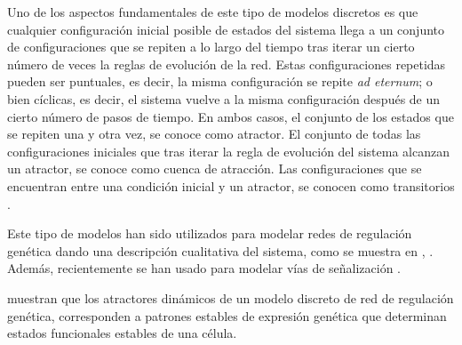 Uno de los aspectos fundamentales de este tipo de modelos discretos es que cualquier configuración inicial posible de estados del sistema llega a un conjunto de configuraciones que se repiten a lo largo del tiempo tras iterar un cierto número de veces la reglas de evolución de la red. Estas configuraciones repetidas pueden ser puntuales, es decir, la misma configuración se repite \emph{ad eternum}; o bien cíclicas, es decir, el sistema vuelve a la misma configuración después de un cierto número de pasos de tiempo. En ambos casos, el conjunto de los estados que se repiten una y otra vez, se conoce como atractor. El conjunto de todas las configuraciones iniciales que tras iterar la regla de evolución del sistema alcanzan un atractor, se conoce como cuenca de atracción. Las configuraciones que se encuentran entre una condición inicial y un atractor, se conocen como transitorios \citeauthor{Bornholdt:2005hg} \citep{Bornholdt:2005hg} \citeauthor{Gershenson:2004uq} \citep{Gershenson:2004uq}.


Este tipo de modelos han sido utilizados para modelar redes de regulación genética dando una descripción cualitativa del sistema, como se muestra en \citeauthor{EspinosaSoto:2004jr} \citep{EspinosaSoto:2004jr}, \citeauthor{Albert:2003vx} \citep{Albert:2003vx}. Además, recientemente se han usado para modelar vías de señalización \citeauthor{Morris:2010gb} \citep{Morris:2010gb}.


\citeauthor{huang2005} \citep{huang2005} muestran que los atractores din\'amicos de un modelo discreto de red de regulación genética, corresponden a patrones estables de expresi\'on gen\'etica que determinan estados funcionales estables de una c\'elula. 





